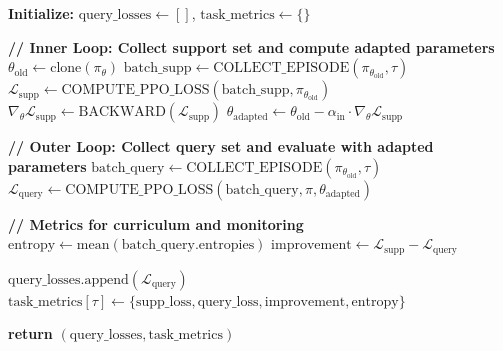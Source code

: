 \documentclass[11pt,a4paper]{article}
\begin{document}
\begin{algorithm}[h]
\caption{COMPUTE\_FOMAML\_LOSSES: Inner-Loop Adaptation + Outer-Loop Evaluation}
\label{alg:fomaml}
\begin{algorithmic}[1]



\State \textbf{Initialize:} $\text{query\_losses} \leftarrow []$, $\text{task\_metrics} \leftarrow \{\}$


	\State \textbf{// Inner Loop: Collect support set and compute adapted parameters}
	\State $\theta_{\text{old}} \leftarrow \text{clone}(\pi_\theta)$ 
	\State $\text{batch\_supp} \leftarrow \text{COLLECT\_EPISODE}(\pi_{\theta_{\text{old}}}, \tau)$ 
	\State $\mathcal{L}_{\text{supp}} \leftarrow \text{COMPUTE\_PPO\_LOSS}(\text{batch\_supp}, \pi_{\theta_{\text{old}}})$
	\State $\nabla_\theta \mathcal{L}_{\text{supp}} \leftarrow \text{BACKWARD}(\mathcal{L}_{\text{supp}})$
	\State $\theta_{\text{adapted}} \leftarrow \theta_{\text{old}} - \alpha_{\text{in}} \cdot \nabla_\theta \mathcal{L}_{\text{supp}}$ 

	\State \textbf{// Outer Loop: Collect query set and evaluate with adapted parameters}
	\State $\text{batch\_query} \leftarrow \text{COLLECT\_EPISODE}(\pi_{\theta_{\text{old}}}, \tau)$ 
	\State $\mathcal{L}_{\text{query}} \leftarrow \text{COMPUTE\_PPO\_LOSS}(\text{batch\_query}, \pi, \theta_{\text{adapted}})$

	\State \textbf{// Metrics for curriculum and monitoring}
	\State $\text{entropy} \leftarrow \text{mean}(\text{batch\_query.entropies})$
	\State $\text{improvement} \leftarrow \mathcal{L}_{\text{supp}} - \mathcal{L}_{\text{query}}$

	\State $\text{query\_losses}.\text{append}(\mathcal{L}_{\text{query}})$
	\State $\text{task\_metrics}[\tau] \leftarrow \{\text{supp\_loss}, \text{query\_loss}, \text{improvement}, \text{entropy}\}$

\EndFor

\State \textbf{return} $(\text{query\_losses}, \text{task\_metrics})$

\end{algorithmic}
\end{algorithm}
\end{document}
